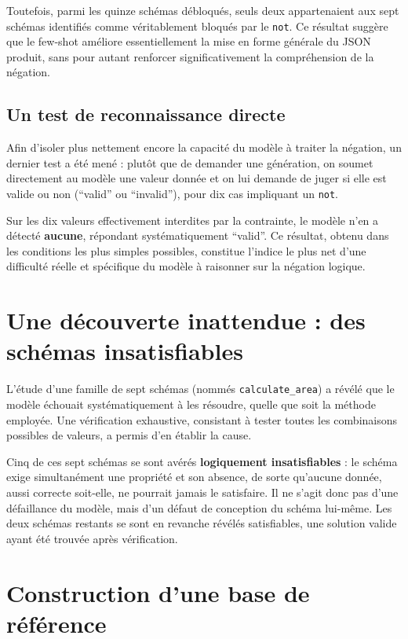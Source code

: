 \documentclass[11pt,a4paper]{article}
\begin{document}
Toutefois, parmi les quinze schémas débloqués, seuls deux appartenaient aux sept schémas identifiés comme véritablement bloqués par le \texttt{not}. Ce résultat suggère que le few-shot améliore essentiellement la mise en forme générale du JSON produit, sans pour autant renforcer significativement la compréhension de la négation.

\subsection{Un test de reconnaissance directe}

Afin d'isoler plus nettement encore la capacité du modèle à traiter la négation, un dernier test a été mené : plutôt que de demander une génération, on soumet directement au modèle une valeur donnée et on lui demande de juger si elle est valide ou non (``valid'' ou ``invalid''), pour dix cas impliquant un \texttt{not}.

Sur les dix valeurs effectivement interdites par la contrainte, le modèle n'en a détecté \textbf{aucune}, répondant systématiquement ``valid''. Ce résultat, obtenu dans les conditions les plus simples possibles, constitue l'indice le plus net d'une difficulté réelle et spécifique du modèle à raisonner sur la négation logique.

\section{Une découverte inattendue : des schémas insatisfiables}

L'étude d'une famille de sept schémas (nommés \texttt{calculate\_area}) a révélé que le modèle échouait systématiquement à les résoudre, quelle que soit la méthode employée. Une vérification exhaustive, consistant à tester toutes les combinaisons possibles de valeurs, a permis d'en établir la cause.

Cinq de ces sept schémas se sont avérés \textbf{logiquement insatisfiables} : le schéma exige simultanément une propriété et son absence, de sorte qu'aucune donnée, aussi correcte soit-elle, ne pourrait jamais le satisfaire. Il ne s'agit donc pas d'une défaillance du modèle, mais d'un défaut de conception du schéma lui-même. Les deux schémas restants se sont en revanche révélés satisfiables, une solution valide ayant été trouvée après vérification.

\section{Construction d'une base de référence}
\end{document}
